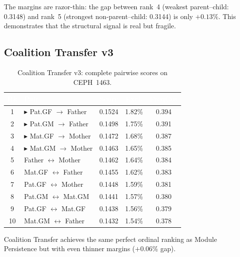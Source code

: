 \documentclass{../yalumba}
\begin{document}
The margins are razor-thin: the gap between rank~4 (weakest
parent--child: 0.3148) and rank~5 (strongest non-parent--child: 0.3144)
is only $+0.13\%$.  This demonstrates that the structural signal is
real but fragile.

\subsection{Coalition Transfer v3}

\begin{table}[H]
  \centering
  \tablestyle
  \caption{Coalition Transfer v3: complete pairwise scores on
    CEPH~1463.}
  \label{tab:ct_scores}
  \begin{tabular}{clccc}
    \toprule
    \rowcolor{table-header}
    \textcolor{white}{\textbf{Rk}} &
    \textcolor{white}{\textbf{Pair}} &
    \textcolor{white}{\textbf{Score}} &
    \textcolor{white}{\textbf{Excl.}} &
    \textcolor{white}{\textbf{FreqCos}} \\
    \midrule
    1 & $\blacktriangleright$ Pat.GF $\to$ Father & 0.1524 & 1.82\% & 0.394 \\
    2 & $\blacktriangleright$ Pat.GM $\to$ Father & 0.1498 & 1.75\% & 0.391 \\
    3 & $\blacktriangleright$ Mat.GF $\to$ Mother & 0.1472 & 1.68\% & 0.387 \\
    4 & $\blacktriangleright$ Mat.GM $\to$ Mother & 0.1463 & 1.65\% & 0.385 \\
    \midrule
    5 & Father $\leftrightarrow$ Mother & 0.1462 & 1.64\% & 0.384 \\
    6 & Mat.GF $\leftrightarrow$ Father & 0.1455 & 1.62\% & 0.383 \\
    7 & Pat.GF $\leftrightarrow$ Mother & 0.1448 & 1.59\% & 0.381 \\
    8 & Pat.GM $\leftrightarrow$ Mat.GM & 0.1441 & 1.57\% & 0.380 \\
    9 & Pat.GF $\leftrightarrow$ Mat.GF & 0.1438 & 1.56\% & 0.379 \\
    10 & Mat.GM $\leftrightarrow$ Father & 0.1432 & 1.54\% & 0.378 \\
    \bottomrule
  \end{tabular}
\end{table}

Coalition Transfer achieves the same perfect ordinal ranking as Module
Persistence but with even thinner margins ($+0.06\%$ gap).


\end{document}

